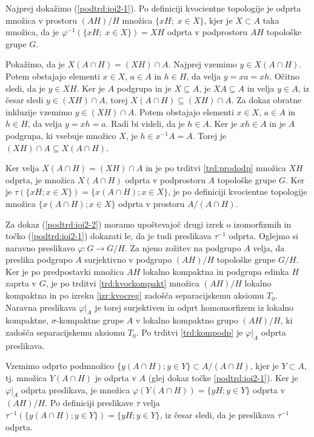 \documentclass[mat1]{fmfdelo}
\begin{document}
\begin{dokaz}
Najprej dokažimo (\ref{podtrd:ioi2-1}).
Po definiciji kvocientne topologije je odprta množica v prostoru $(AH)/H$ množica $\lbrace xH ; \; x\in X \rbrace$, kjer je $X \subset A$ taka množica, da je $\varphi^{-1}(\lbrace xH ; \; x\in X \rbrace) = XH$ odprta v podprostoru $AH$ topološke grupe $G$.

Pokažimo, da je $X(A \cap H) = (XH)\cap A$. Najprej vzemimo $y \in X(A \cap H)$. Potem obstajajo elementi $x \in X$, $a \in A$ in $h \in H$, da velja $y = xa = xh$. Očitno sledi, da je $y \in XH$. Ker je $A$ podgrupa in je $X \subseteq A$, je $XA \subseteq A$ in velja $y \in A$, iz česar sledi $y \in (XH)\cap A$, torej $X(A\cap H) \subseteq (XH)\cap A$. Za dokaz obratne inkluzije vzemimo $y \in (XH)\cap A$. Potem obstajajo elementi $x \in X$, $a \in A$ in $h \in H$, da velja $y = xh = a$. Radi bi videli, da je $h \in A$. Ker je $xh \in A$ in je $A$ podgrupa, ki vsebuje množico $X$, je $h \in x^{-1}A = A$. Torej je $(XH)\cap A \subseteq X(A \cap H)$.
 
Ker velja $X(A \cap H) = (XH)\cap A$ in je po trditvi \ref{trd:prododp} množica $XH$ odprta, je množica $X(A \cap H)$ odprta v podprostoru $A$ topološke grupe $G$. Ker je $\tau(\lbrace xH ; x \in X \rbrace) = \lbrace x(A \cap H) ; x \in X \rbrace$, je po definiciji kvocientne topologije množica $\lbrace x(A\cap H) ; x \in X \rbrace$ odprta v prostoru $A/(A \cap H)$.

Za dokaz (\ref{podtrd:ioi2-2}) moramo upoštevajoč drugi izrek o izomorfizmih in točko (\ref{podtrd:ioi2-1}) dokazati le, da je tudi preslikava $\tau^{-1}$ odprta.
Oglejmo si naravno preslikavo $\varphi\colon G \to G/H$. Za njeno zožitev na podgrupo $A$ velja, da preslika podgrupo $A$ surjektivno v podgrupo $(AH)/H$ topološke grupe $G/H$. Ker je po predpostavki množica $AH$ lokalno kompaktna in podgrupa edinka $H$ zaprta v $G$, je po trditvi \ref{trd:kvockompakt} množica $(AH)/H$ lokalno kompaktna in po izreku \ref{izr:kvocreg} zadošča separacijskemu aksiomu $T_0$. Naravna preslikava $\varphi|_A$ je torej surjektiven in odprt homomorfizem iz lokalno kompaktne, $\sigma$-kompaktne grupe $A$ v lokalno kompaktno grupo $(AH)/H$, ki zadošča separacijskemu aksiomu $T_0$. Po trditvi \ref{trd:kompodp} je $\varphi|_A$ odprta preslikava.

Vzemimo odprto podmnožico $\lbrace y(A \cap H) ; y \in Y \rbrace \subset A/(A \cap H)$, kjer je $Y \subset A$, tj. množica $Y(A \cap H)$ je odprta v $A$ (glej dokaz točke \ref{podtrd:ioi2-1}). Ker je $\varphi|_A$ odprta preslikava, je množica $\varphi(Y(A \cap H)) = \lbrace yH ; y \in Y \rbrace$ odprta v $(AH)/H$. Po definiciji preslikave $\tau$ velja $\tau^{-1}(\lbrace y(A \cap H) ; y \in Y \rbrace) = \lbrace yH ; y \in Y \rbrace$, iz česar sledi, da je preslikava $\tau^{-1}$ odprta.
\end{dokaz}
\end{document}
